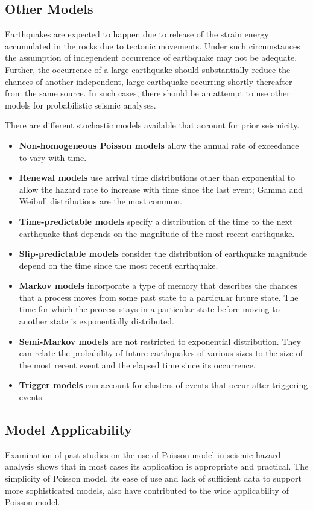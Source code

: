 \documentclass[a4paper,english,12pt]{article}
\begin{document}
\subsection{Other Models}
Earthquakes are expected to happen due to release of the strain energy accumulated in the rocks due to tectonic movements. Under such circumstances the assumption of independent occurrence of earthquake may not be adequate. Further, the occurrence of a large earthquake should substantially reduce the chances of another independent, large earthquake occurring shortly thereafter from the same source. In such cases, there should be an attempt to use other models for probabilistic seismic analyses. 

There are different stochastic models available that account for prior seismicity.
\begin{itemize}
\item \textbf{Non-homogeneous Poisson models} allow the annual rate of exceedance to vary with time.
\item \textbf{Renewal models} use arrival time distributions other than exponential to allow the hazard rate to increase with time since the last event; Gamma and Weibull distributions are the most common.
\item \textbf{Time-predictable models} specify a distribution of the time to the next earthquake that depends on the magnitude of the most recent earthquake.
\item \textbf{Slip-predictable models} consider the distribution of earthquake magnitude depend on the time since the most recent earthquake.
\item \textbf{Markov models} incorporate a type of memory that describes the chances that a process moves from some past state to a particular future state. The time for which the process stays in a particular state before moving to another state is exponentially distributed.
\item \textbf{Semi-Markov models} are not restricted to exponential distribution. They can relate the probability of future earthquakes of various sizes to the size of the most recent event and the elapsed time since its occurrence.
\item \textbf{Trigger models} can account for clusters of events that occur after triggering events.
\end{itemize}
\subsection{Model Applicability}
Examination of past studies on the use of Poisson model in seismic hazard analysis shows that in most cases its application is appropriate and practical. The simplicity of Poisson model, its ease of use and lack of sufficient data to support more sophisticated models, also have contributed to the wide applicability of Poisson model.
\end{document}

